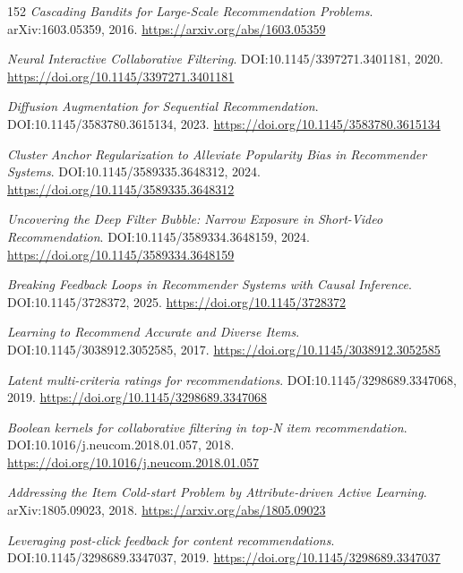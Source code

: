 \documentclass[11pt,a4paper]{article}
\begin{document}
\begin{thebibliography}{152}
\newblock \emph{Cascading Bandits for Large-Scale Recommendation Problems}.
\newblock arXiv:1603.05359, 2016.
\newblock \url{https://arxiv.org/abs/1603.05359}

\newblock \emph{Neural Interactive Collaborative Filtering}.
\newblock DOI:10.1145/3397271.3401181, 2020.
\newblock \url{https://doi.org/10.1145/3397271.3401181}

\newblock \emph{Diffusion Augmentation for Sequential Recommendation}.
\newblock DOI:10.1145/3583780.3615134, 2023.
\newblock \url{https://doi.org/10.1145/3583780.3615134}

\newblock \emph{Cluster Anchor Regularization to Alleviate Popularity Bias in Recommender Systems}.
\newblock DOI:10.1145/3589335.3648312, 2024.
\newblock \url{https://doi.org/10.1145/3589335.3648312}

\newblock \emph{Uncovering the Deep Filter Bubble: Narrow Exposure in Short-Video Recommendation}.
\newblock DOI:10.1145/3589334.3648159, 2024.
\newblock \url{https://doi.org/10.1145/3589334.3648159}

\newblock \emph{Breaking Feedback Loops in Recommender Systems with Causal Inference}.
\newblock DOI:10.1145/3728372, 2025.
\newblock \url{https://doi.org/10.1145/3728372}

\newblock \emph{Learning to Recommend Accurate and Diverse Items}.
\newblock DOI:10.1145/3038912.3052585, 2017.
\newblock \url{https://doi.org/10.1145/3038912.3052585}

\newblock \emph{Latent multi-criteria ratings for recommendations}.
\newblock DOI:10.1145/3298689.3347068, 2019.
\newblock \url{https://doi.org/10.1145/3298689.3347068}

\newblock \emph{Boolean kernels for collaborative filtering in top-N item recommendation}.
\newblock DOI:10.1016/j.neucom.2018.01.057, 2018.
\newblock \url{https://doi.org/10.1016/j.neucom.2018.01.057}

\newblock \emph{Addressing the Item Cold-start Problem by Attribute-driven Active Learning}.
\newblock arXiv:1805.09023, 2018.
\newblock \url{https://arxiv.org/abs/1805.09023}

\newblock \emph{Leveraging post-click feedback for content recommendations}.
\newblock DOI:10.1145/3298689.3347037, 2019.
\newblock \url{https://doi.org/10.1145/3298689.3347037}


\end{thebibliography}
\end{document}
